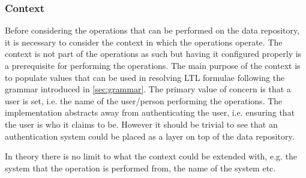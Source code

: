 \subsubsection{Context}
Before considering the operations that can be performed on the data repository, it is necessary to consider the context in which the operations operate. The context is not part of the operations as such but having it configured properly is a prerequisite for performing the operations. The main purpose of the context is to populate values that can be used in resolving LTL formulae following the grammar introduced in \autoref{sec:grammar}. The primary value of concern is that a user is set, i.e. the name of the user/person performing the operations. The implementation abstracts away from authenticating the user, i.e. ensuring that the user is who it claims to be. However it should be trivial to see that an authentication system could be placed as a layer on top of the data repository.

In theory there is no limit to what the context could be extended with, e.g. the system that the operation is performed from, the name of the system etc.

